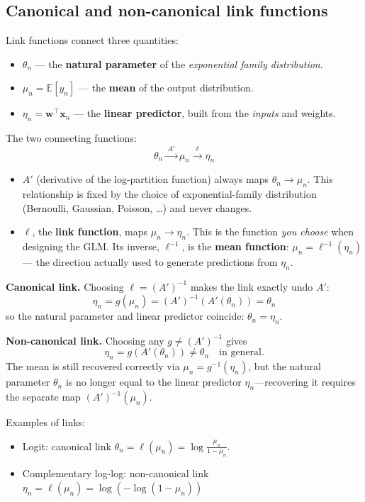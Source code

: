 \documentclass[11pt]{article}
\begin{document}
\subsection{Canonical and non-canonical link functions}

Link functions connect three quantities:
\begin{itemize}
    \item $\theta_n$ --- the \textbf{natural parameter} of the \textit{exponential family distribution}.
    \item $\mu_n = \mathbb{E}[y_n]$ --- the \textbf{mean} of the output distribution.
    \item $\eta_n = \boldsymbol{w}^\top \boldsymbol{x}_n$ --- the \textbf{linear predictor}, built from the \textit{inputs} and weights.
\end{itemize}

\noindent The two connecting functions:
$$
\theta_n \xrightarrow{\ A'\ } \mu_n \xrightarrow{\ \ell\ } \eta_n
$$
\begin{itemize}
    \item $A'$ (derivative of the log-partition function) always maps $\theta_n \to \mu_n$. This relationship is fixed by the choice of exponential-family distribution (Bernoulli, Gaussian, Poisson, \ldots) and never changes.
    \item $\ell$, the \textbf{link function}, maps $\mu_n \to \eta_n$. This is the function \emph{you choose} when designing the GLM. Its inverse, $\ell^{-1}$, is the \textbf{mean function}: $\mu_n = \ell^{-1}(\eta_n)$ --- the direction actually used to generate predictions from $\eta_n$.
\end{itemize}

\textbf{Canonical link.} Choosing $\ell = (A')^{-1}$ makes the link exactly undo $A'$:
$$
\eta_n = g(\mu_n) = (A')^{-1}(A'(\theta_n)) = \theta_n
$$
so the natural parameter and linear predictor coincide: $\theta_n = \eta_n$.

\textbf{Non-canonical link.} Choosing any $g \ne (A')^{-1}$ gives
$$
\eta_n = g(A'(\theta_n)) \ne \theta_n \quad \text{in general.}
$$
The mean is still recovered correctly via $\mu_n = g^{-1}(\eta_n)$, but the natural parameter $\theta_n$ is no longer equal to the linear predictor $\eta_n$---recovering it requires the separate map $(A')^{-1}(\mu_n)$.

Examples of links:
\begin{itemize}
    \item Logit: canonical link $\theta_n = \ell(\mu_n) = \log\frac{\mu_n}{1-\mu_n}$.
    \item Complementary log-log: non-canonical link $\eta_n = \ell(\mu_n) = \log(-\log(1-\mu_n))$
\end{itemize}
\end{document}
